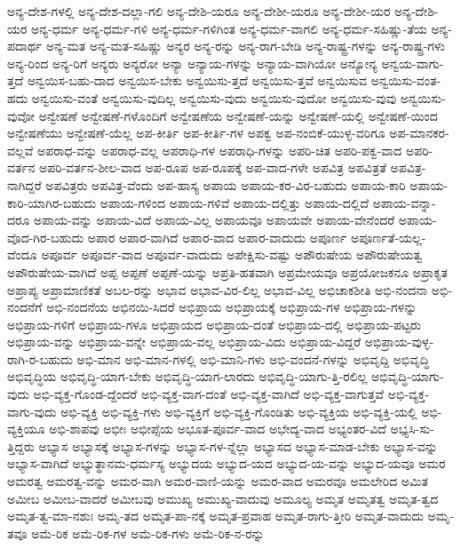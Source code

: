 {ಅನ್ಯ-ದೇಶ-ಗಳಲ್ಲಿ
ಅನ್ಯ-ದೇಶ-ದಲ್ಲಾ-ಗಲಿ
ಅನ್ಯ-ದೇಶಿ-ಯರೂ
ಅನ್ಯ-ದೇಶೀ-ಯರೂ
ಅನ್ಯ-ದೇಶೀ-ಯರ
ಅನ್ಯ-ದೇಶಿ-ಯರ
ಅನ್ಯ-ಧರ್ಮ
ಅನ್ಯ-ಧರ್ಮ-ಗಳಿ
ಅನ್ಯ-ಧರ್ಮ-ಗಳಿಗಿಂತ
ಅನ್ಯ-ಧರ್ಮ-ವಾಗಲಿ
ಅನ್ಯ-ಧರ್ಮ-ಸಹಿಷ್ಣು-ತೆಯ
ಅನ್ಯ-ಪದಾರ್ಥ
ಅನ್ಯ-ಮತ
ಅನ್ಯ-ಮತ-ಸಹಿಷ್ಣು
ಅನ್ಯರ
ಅನ್ಯ-ರನ್ನು
ಅನ್ಯ-ರಾಗ-ಬೇಡಿ
ಅನ್ಯ-ರಾಷ್ಟ್ರ-ಗಳನ್ನು
ಅನ್ಯ-ರಾಷ್ಟ್ರ-ಗಳು
ಅನ್ಯ-ರಿಂದ
ಅನ್ಯ-ರಿಗೆ
ಅನ್ಯರು
ಅನ್ಯರೋ
ಅನ್ಯಾ
ಅನ್ಯಾಯ-ಗಳನ್ನು
ಅನ್ಯಾಯ-ವಾಗಿಯೋ
ಅನ್ಯೋನ್ಯ
ಅನ್ವಯ-ವಾಗು-ತ್ತದೆ
ಅನ್ವಯಿಸ-ಬಹು-ದಾದ
ಅನ್ವಯಿಸ-ಬೇಕು
ಅನ್ವಯಿಸು-ತ್ತದೆ
ಅನ್ವಯಿಸು-ತ್ತವೆ
ಅನ್ವಯಿಸುವ
ಅನ್ವಯಿಸು-ವಂತ-ಹದು
ಅನ್ವಯಿಸು-ವಂತೆ
ಅನ್ವಯಿಸು-ವುದಿಲ್ಲ
ಅನ್ವಯಿಸು-ವುದು
ಅನ್ವಯಿಸು-ವುದೋ
ಅನ್ವಯಿಸು-ವುವು
ಅನ್ವಯಿಸು-ವುವೋ
ಅನ್ವೇಷಣೆ
ಅನ್ವೇಷಣೆ-ಗಳೊಂದಿಗೆ
ಅನ್ವೇಷಣೆಯ
ಅನ್ವೇಷಣೆ-ಯನ್ನು
ಅನ್ವೇಷಣೆ-ಯಲ್ಲಿ
ಅನ್ವೇಷಣೆ-ಯಿಂದ
ಅನ್ವೇಷಣೆಯು
ಅನ್ವೇಷಣೆ-ಯೆಲ್ಲ
ಅಪ-ಕೀರ್ತಿ
ಅಪ-ಕೀರ್ತಿ-ಗಳ
ಅಪಕ್ವ
ಅಪ-ನಂಬಿಕೆ-ಯುಳ್ಳ-ವರಿಗೂ
ಅಪ-ಮಾನಕರ-ವಲ್ಲವೆ
ಅಪರಾಧ-ವನ್ನು
ಅಪರಾಧ-ವಲ್ಲ
ಅಪರಾಧಿ-ಗಳ
ಅಪರಾಧಿ-ಗಳನ್ನು
ಅಪರಿ-ಚಿತ
ಅಪರಿ-ಪಕ್ವ-ವಾದ
ಅಪರಿ-ವರ್ತನ
ಅಪರಿ-ವರ್ತನ-ಶೀಲ-ವಾದ
ಅಪ-ರೂಪ
ಅಪ-ರೂಪಕ್ಕೆ
ಅಪ-ವಾದ-ಗಳೇ
ಅಪವಿತ್ರ
ಅಪವಿತ್ರತೆ
ಅಪವಿತ್ರ-ನಾಗಿದ್ದರೆ
ಅಪವಿತ್ರರು
ಅಪವಿತ್ರ-ವೆಂದು
ಅಪ-ಹಾಸ್ಯ
ಅಪಾಯ
ಅಪಾಯ-ಕರ-ವಿರ-ಬಹುದು
ಅಪಾಯ-ಕಾರಿ
ಅಪಾಯ-ಕಾರಿ-ಯಾಗಿರ-ಬಹುದು
ಅಪಾಯ-ಗಳಿಂದ
ಅಪಾಯ-ಗಳಿವೆ
ಅಪಾಯ-ದಲ್ಲಿತ್ತು
ಅಪಾಯ-ದಲ್ಲಿದೆ
ಅಪಾಯ-ವನ್ನಾ-ದರೂ
ಅಪಾಯ-ವನ್ನು
ಅಪಾಯ-ವಿದೆ
ಅಪಾಯ-ವಿಲ್ಲ
ಅಪಾಯವೂ
ಅಪಾಯವೇ
ಅಪಾಯ-ವೇನೆಂದರೆ
ಅಪಾಯ-ವೊದ-ಗಿರ-ಬಹುದು
ಅಪಾರ
ಅಪಾರ-ವಾಗಿದೆ
ಅಪಾರ-ವಾದ
ಅಪಾರ-ವಾದುದು
ಅಪೂರ್ಣ
ಅಪೂರ್ಣತೆ-ಯಲ್ಲ-ವೆಂದೂ
ಅಪೂರ್ವ
ಅಪೂರ್ವ-ವಾದ
ಅಪೂರ್ವ-ವಾದುದು
ಅಪೇಕ್ಷಿಸು-ವಷ್ಟು
ಅಪೌರುಷೇಯ
ಅಪೌರುಷೇಯತ್ವ
ಅಪೌರುಷೇಯ-ವಾಗಿದೆ
ಅಪ್ಪ
ಅಪ್ಪಣೆ
ಅಪ್ಪಣೆ-ಯನ್ನು
ಅಪ್ರತಿ-ಹತವಾಗಿ
ಅಪ್ರಮೇಯವೂ
ಅಪ್ರಯೋಜಕನೂ
ಅಪ್ರಾಕೃತ
ಅಪ್ರಾಪ್ಯ
ಅಪ್ರಾಮಾಣಿಕತೆ
ಅಬಲ-ರನ್ನು
ಅಭಾವ
ಅಭಾವ-ವಿರ-ಲಿಲ್ಲ
ಅಭಾವ-ವಿಲ್ಲ
ಅಭಿಚಾಕಶೀತಿ
ಅಭಿ-ನಂದನಾ
ಅಭಿ-ನಂದನೆಗೆ
ಅಭಿ-ನಂದನೆಯ
ಅಭಿನಯಿ-ಸಿದರೆ
ಅಭಿಪ್ರಾಯ
ಅಭಿಪ್ರಾಯಕ್ಕೆ
ಅಭಿಪ್ರಾಯ-ಗಳ
ಅಭಿಪ್ರಾಯ-ಗಳನ್ನು
ಅಭಿಪ್ರಾಯ-ಗಳಿಗೆ
ಅಭಿಪ್ರಾಯ-ಗಳೂ
ಅಭಿಪ್ರಾಯದ
ಅಭಿಪ್ರಾಯ-ದಂತೆ
ಅಭಿಪ್ರಾಯ-ದಲ್ಲಿ
ಅಭಿಪ್ರಾಯ-ಪಟ್ಟರು
ಅಭಿಪ್ರಾಯ-ವನ್ನು
ಅಭಿಪ್ರಾಯ-ವನ್ನೇ
ಅಭಿಪ್ರಾಯ-ವಲ್ಲ
ಅಭಿಪ್ರಾಯ-ವಿದು
ಅಭಿಪ್ರಾಯ-ವಿದ್ದರೆ
ಅಭಿಪ್ರಾಯ-ವುಳ್ಳ-ರಾಗಿ-ರ-ಬಹುದು
ಅಭಿ-ಮಾನ
ಅಭಿ-ಮಾನ-ಗಳಲ್ಲಿ
ಅಭಿ-ಮಾನಿ-ಗಳು
ಅಭಿ-ವಂದನೆ-ಗಳನ್ನು
ಅಭಿವೃದ್ದಿ
ಅಭಿವೃದ್ಧಿ
ಅಭಿವೃದ್ಧಿಯ
ಅಭಿವೃದ್ಧಿ-ಯಾಗ-ಬೇಕು
ಅಭಿವೃದ್ಧಿ-ಯಾಗ-ಲಾರದು
ಅಭಿವೃದ್ಧಿ-ಯಾಗು-ತ್ತಿ-ರಲಿಲ್ಲ
ಅಭಿವೃದ್ಧಿ-ಯಾಗು-ವುದು
ಅಭಿ-ವ್ಯಕ್ತ-ಗೊಂಡ-ದ್ದೆಂದರೆ
ಅಭಿ-ವ್ಯಕ್ತ-ವಾಗ-ದಂತೆ
ಅಭಿ-ವ್ಯಕ್ತ-ವಾಗಿದೆ
ಅಭಿ-ವ್ಯಕ್ತ-ವಾಗುತ್ತವೆ
ಅಭಿ-ವ್ಯಕ್ತ-ವಾಗು-ವುದು
ಅಭಿ-ವ್ಯಕ್ತಿ
ಅಭಿ-ವ್ಯಕ್ತಿ-ಗಳು
ಅಭಿ-ವ್ಯಕ್ತಿಗೆ
ಅಭಿ-ವ್ಯಕ್ತಿ-ಗೊಂಡಿತು
ಅಭಿ-ವ್ಯಕ್ತಿಯ
ಅಭಿ-ವ್ಯಕ್ತಿ-ಯಲ್ಲಿ
ಅಭಿ-ವ್ಯಕ್ತಿಯೂ
ಅಭಿ-ಶಾಪವು
ಅಭೀಃ
ಅಭೀಪ್ಸೆಯ
ಅಭೂತ-ಪೂರ್ವ-ವಾದ
ಅಭೇದ್ಯ-ವಾದ
ಅಭ್ಯಂತರ-ವಿದೆ
ಅಭ್ಯಸಿ-ಸು-ತ್ತಿದ್ದರು
ಅಭ್ಯಾಸ
ಅಭ್ಯಾಸಕ್ಕೆ
ಅಭ್ಯಾಸ-ಗಳನ್ನು
ಅಭ್ಯಾಸ-ಗಳ-ನ್ನೆಲ್ಲಾ
ಅಭ್ಯಾಸದ
ಅಭ್ಯಾಸ-ಮಾಡ-ಬೇಕು
ಅಭ್ಯಾಸ-ವನ್ನು
ಅಭ್ಯಾಸ-ವಾಗಿದೆ
ಅಭ್ಯುತ್ಥಾನಮ-ಧರ್ಮಸ್ಯ
ಅಭ್ಯುದಯ
ಅಭ್ಯುದ-ಯದ
ಅಭ್ಯುದ-ಯ-ವನ್ನು
ಅಭ್ಯುದ-ಯವೂ
ಅಮರ
ಅಮರತ್ವ
ಅಮರತ್ವ-ವನ್ನು
ಅಮರ-ವಾಗಿ
ಅಮರ-ವಾಣಿ-ಯನ್ನು
ಅಮರ-ವಾದ
ಅಮರವೂ
ಅಮಲೇರಿದ
ಅಮಿತ
ಅಮೀಬ
ಅಮೀಬ-ವಾದರೆ
ಅಮೀಬವು
ಅಮುಖ್ಯ
ಅಮುಖ್ಯ-ವಾದುವು
ಅಮೂಲ್ಯ
ಅಮೃತ
ಅಮೃತತ್ವ
ಅಮೃತ-ತ್ವದ
ಅಮೃತ-ತ್ವ-ಮಾ-ನಶುಃ
ಅಮೃ-ತದ
ಅಮೃತ-ಪಾ-ನಕ್ಕೆ
ಅಮೃತ-ಪ್ರವಾಹ
ಅಮೃತ-ರಾಗು-ತ್ತೀರಿ
ಅಮೃತ-ವಾದುದು
ಅಮೃ-ತವೂ
ಅಮೆ-ರಿಕ
ಅಮೆ-ರಿಕ-ಗಳ
ಅಮೆ-ರಿಕ-ಗಳು
ಅಮೆ-ರಿಕ-ನ-ರನ್ನು
}
